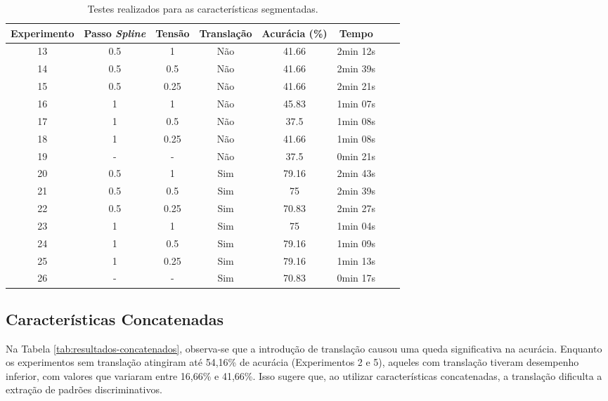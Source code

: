 \begin{table}[h!]
    \centering
    \caption{Testes realizados para as características segmentadas.}
    \begin{tabular}{|c|c|c|c|c|c|c|c|}
    \hline
    \textbf{Experimento} & \textbf{Passo \textit{Spline}} & \textbf{Tensão} & \textbf{Translação} & \textbf{Acurácia (\%)} & \textbf{Tempo} \\
    \hline

    13 & 0.5 & 1 & Não & 41.66 & 2min 12s \\
    14 & 0.5 & 0.5 & Não & 41.66 & 2min 39s \\
    15 & 0.5 & 0.25 & Não & 41.66 & 2min 21s \\
    
    16 & 1 & 1 & Não & 45.83 & 1min 07s \\
    17 & 1 & 0.5 & Não & 37.5 & 1min 08s \\
    18 & 1 & 0.25 & Não & 41.66 & 1min 08s \\
 
    19 & - & - & Não & 37.5 & 0min 21s\\
 
    20 & 0.5 & 1 & Sim & 79.16 & 2min 43s \\
    21 & 0.5 & 0.5 & Sim & 75 & 2min 39s \\
    22 & 0.5 & 0.25 & Sim & 70.83 & 2min 27s \\
 
    23 & 1 & 1 & Sim & 75 & 1min 04s \\
    24 & 1 & 0.5 & Sim & 79.16 & 1min 09s \\
    25 & 1 & 0.25 & Sim & 79.16 & 1min 13s \\
 
    26 & - & - & Sim & 70.83 & 0min 17s\\
    \hline
    \end{tabular}
    \label{tab:resultados-segmentados}
\end{table}

\subsection{Características Concatenadas}

Na Tabela \ref{tab:resultados-concatenados}, observa-se que a introdução de translação causou uma queda significativa na acurácia. Enquanto os experimentos sem translação atingiram até 54,16\% de acurácia (Experimentos 2 e 5), aqueles com translação tiveram desempenho inferior, com valores que variaram entre 16,66\% e 41,66\%. Isso sugere que, ao utilizar características concatenadas, a translação dificulta a extração de padrões discriminativos.

